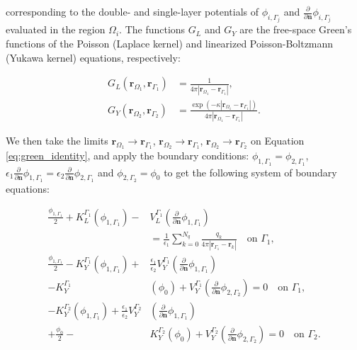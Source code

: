 \noindent corresponding to the double- and single-layer potentials of $\phi_{i,\Gamma_j}$ and $\frac{\partial}{\partial \mathbf{n}} \phi_{i,\Gamma_j}$ evaluated in the region $\Omega_i$. The functions $G_L$ and $G_Y$ are the free-space Green's functions of the Poisson (Laplace kernel) and linearized Poisson-Boltzmann (Yukawa kernel) equations, respectively:

\begin{align} \label{eq:free-space}
G_L(\mathbf{r}_{\Omega_1},\mathbf{r}_{\Gamma_1}) &= \frac{1}{4\pi|\mathbf{r}_{\Omega_1} - \mathbf{r}_{\Gamma_1}|}, \nonumber \\
G_Y(\mathbf{r}_{\Omega_2},\mathbf{r}_{\Gamma_2}) &= \frac{\exp \left( -\kappa |\mathbf{r}_{\Omega_1} - \mathbf{r}_{\Gamma_1}|\right)}{4\pi|\mathbf{r}_{\Omega_1} - \mathbf{r}_{\Gamma_1}|}.
\end{align}

\noindent We then take the limits 
$\mathbf{r}_{\Omega_1}\!\to\!\mathbf{r}_{\Gamma_1}$, 
$\mathbf{r}_{\Omega_2}\!\to\!\mathbf{r}_{\Gamma_1}$, 
$\mathbf{r}_{\Omega_2}\!\to\!\mathbf{r}_{\Gamma_2}$ on Equation \eqref{eq:green_identity}, and apply the boundary conditions:
$\phi_{1,\Gamma_1} = \phi_{2,\Gamma_1}$, 
$\epsilon_1\frac{\partial}{\partial \mathbf{n}} \phi_{1,\Gamma_1} =  \epsilon_2\frac{\partial}{\partial \mathbf{n}} \phi_{2,\Gamma_1} $ 
and $\phi_{2,\Gamma_2} = \phi_0$ to get the following system of boundary equations:

\vspace{1em}

%
\begin{align} \label{eq:integral_eq}
\frac{\phi_{1,\Gamma_1}}{2}+ K_{L}^{\Gamma_1}(\phi_{1,\Gamma_1}) - &V_{L}^{\Gamma_1} \left(\frac{\partial}{\partial \mathbf{n}}\phi_{1,\Gamma_1} \right)\nonumber\\  
&= \frac{1}{\epsilon_1} \sum_{k=0}^{N_q} \frac{q_k}{4\pi|\mathbf{r}_{\Gamma_1} - \mathbf{r}_k|}  \quad \text{on $\Gamma_1$,} \nonumber \\ 
\frac{\phi_{1,\Gamma_1}}{2} - K_{Y}^{\Gamma_1}(\phi_{1,\Gamma_1}) +  &\frac{\epsilon_1}{\epsilon_2} V_{Y}^{\Gamma_1} \left( \frac{\partial}{\partial \mathbf{n}} \phi_{1,\Gamma_1} \right)\nonumber \\ 
- K_{Y}^{\Gamma_1}&(\phi_{0})  + V_{Y}^{\Gamma_1} \left( \frac{\partial}{\partial \mathbf{n}} \phi_{2,\Gamma_2} \right)  = 0 \quad \text{on $\Gamma_1$,} \nonumber \\ 
- K_{Y}^{\Gamma_2}(\phi_{1,\Gamma_1}) + \frac{\epsilon_1}{\epsilon_2} V_{Y}^{\Gamma_2} &\left( \frac{\partial}{\partial \mathbf{n}} \phi_{1,\Gamma_1} \right)\nonumber \\ 
+ \frac{\phi_{0}}{2} - &K_{Y}^{\Gamma_2}(\phi_{0}) +  V_{Y}^{\Gamma_2} \left( \frac{\partial}{\partial \mathbf{n}} \phi_{2,\Gamma_2} \right)  = 0 \quad \text{on $\Gamma_2$.}
\end{align}


